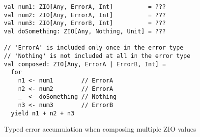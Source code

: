 \begin{algorithm}

\begin{verbatim}
val num1: ZIO[Any, ErrorA, Int]          = ???
val num2: ZIO[Any, ErrorA, Int]          = ???
val num3: ZIO[Any, ErrorB, Int]          = ???
val doSomething: ZIO[Any, Nothing, Unit] = ???

// 'ErrorA' is included only once in the error type
// 'Nothing' is not included at all in the error type
val composed: ZIO[Any, ErrorA | ErrorB, Int] =
  for
    n1 <- num1        // ErrorA
    n2 <- num2        // ErrorA
    _  <- doSomething // Nothing
    n3 <- num3        // ErrorB
  yield n1 + n2 + n3
\end{verbatim}

\caption{Typed error accumulation when composing multiple ZIO values \label{zio:error-accumulation}}
\end{algorithm}